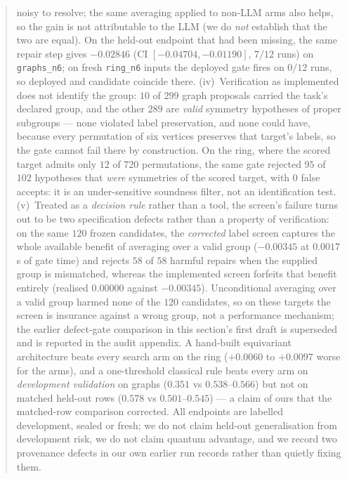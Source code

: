 \documentclass[11pt]{article}
\begin{document}
\begin{abstract}
noisy to resolve; the
same averaging applied to non-LLM arms also helps, so the gain is not attributable to the
LLM (we do \emph{not} establish that the two are equal). On the held-out endpoint that had
been missing, the same repair step gives $-0.02846$ (CI $[-0.04704,-0.01190]$, $7/12$ runs)
on \texttt{graphs\_n6}; on fresh \texttt{ring\_n6} inputs the deployed gate fires on $0/12$
runs, so deployed and candidate coincide there. (iv)~Verification as implemented
does not identify the group: $10$ of $299$ graph proposals carried the task's declared
group, and the other $289$ are \emph{valid} symmetry hypotheses of proper subgroups --- none
violated label preservation, and none could have, because every permutation of six vertices
preserves that target's labels, so the gate cannot fail there by construction. On the ring,
where the scored target admits only $12$ of $720$ permutations, the same gate rejected
$95$ of $102$ hypotheses that \emph{were} symmetries of the scored target, with $0$ false
accepts: it is an under-sensitive soundness filter, not an identification test. (v)~Treated
as a \emph{decision rule} rather than a tool, the screen's failure turns out to be two
specification defects rather than a property of verification: on the same $120$ frozen
candidates, the \emph{corrected} label screen captures the whole available benefit of averaging
over a valid group ($-0.00345$ at $0.0017$\,s of gate time) and rejects $58$ of $58$ harmful
repairs when the supplied group is mismatched, whereas the implemented screen forfeits that
benefit entirely (realised $0.00000$ against $-0.00345$). Unconditional averaging over a valid
group harmed none of the $120$ candidates, so on these targets the screen is insurance against a
wrong group, not a performance mechanism; the earlier defect-gate comparison in this section's
first draft is superseded and is reported in the audit appendix. A hand-built
equivariant architecture beats every search arm on the ring
($+0.0060$ to $+0.0097$ worse for the arms), and a one-threshold classical rule beats every
arm on \emph{development validation} on graphs ($0.351$ vs $0.538$--$0.566$) but not on
matched held-out rows ($0.578$ vs $0.501$--$0.545$) --- a claim of ours that the matched-row
comparison corrected. All endpoints are labelled
development, sealed or fresh; we do not claim held-out generalisation from development
risk, we do not claim quantum advantage, and we record two provenance defects in our own
earlier run records rather than quietly fixing them.
\end{abstract}
\end{document}
